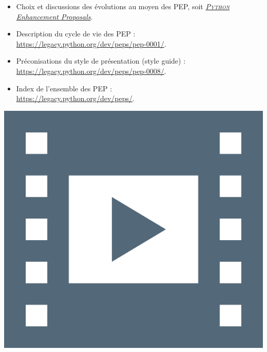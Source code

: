 \begin{gofurther}
\begin{itemize}
\end{itemize}
\begin{itemize}\jazzitem
	\item Choix et discussions des évolutions au moyen des PEP, soit \href{https://en.wikipedia.org/wiki/Python_(programming_language)#Development}{\textit{\textsc{Python} Enhancement Proposals}}.
	\item Description du cycle de vie des PEP :\\ \url{https://legacy.python.org/dev/peps/pep-0001/}.
	\item Préconisations du style de présentation (style guide) :\\ \url{https://legacy.python.org/dev/peps/pep-0008/}.
	\item Index de l'ensemble des PEP :\\ \url{https://legacy.python.org/dev/peps/}.
\end{itemize}
\end{gofurther}


\begin{marginvideo}
	\vspace*{-6cm}%
	\href{https://www.youtube.com/watch?v=iKLMlVFuA_U&list=PL2CXLryTKuwwoPO9s_fd5a4eRoWgHhrKT&index=4}%
		{\includegraphics[width=\marginparwidth]{./Images/Pictograms/film-strip-dark-electric-blue.png}}%
\end{marginvideo}



